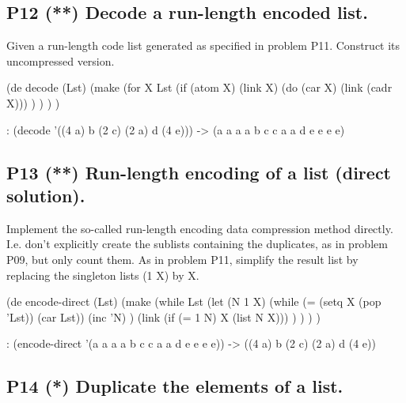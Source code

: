 \subsection*{{P12} (**) Decode a run-length encoded
list.}
\label{sec:99-problems-P12}

Given a run-length code list generated as specified in problem P11.
Construct its uncompressed version.

\begin{wideverbatim}

(de decode (Lst)
   (make
      (for X Lst
         (if (atom X)
            (link X)
            (do (car X) (link (cadr X))) ) ) ) )

\end{wideverbatim}

\begin{wideverbatim}
   : (decode '((4 a) b (2 c) (2 a) d (4 e)))
   -> (a a a a b c c a a d e e e e)
\end{wideverbatim}

\pagebreak{}
\subsection*{{P13} (**) Run-length encoding of a list
(direct solution).}
\label{sec:99-problems-P13}

Implement the so-called run-length encoding data compression method
directly. I.e. don't explicitly create the sublists containing the
duplicates, as in problem P09, but only count them. As in problem P11,
simplify the result list by replacing the singleton lists (1 X) by X.

\begin{wideverbatim}

(de encode-direct (Lst)
   (make
      (while Lst
         (let (N 1  X)
            (while (= (setq X (pop 'Lst)) (car Lst))
               (inc 'N) )
            (link (if (= 1 N) X (list N X))) ) ) ) )

\end{wideverbatim}

\begin{wideverbatim}
   : (encode-direct '(a a a a b c c a a d e e e e))
   -> ((4 a) b (2 c) (2 a) d (4 e))
\end{wideverbatim}

\subsection*{{P14} (*) Duplicate the elements of a
list.}
\label{sec:99-problems-P14}

